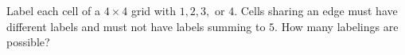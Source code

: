 Label each cell of a $4\times4$ grid with $1,2,3,$ or $4$. Cells sharing an edge must have different labels and must not have labels summing to $5$. How many labelings are possible?
